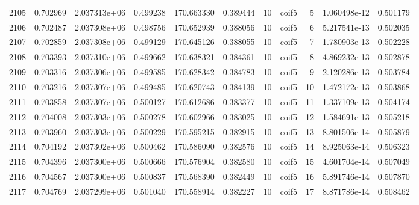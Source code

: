 \begin{tabular}{lrrrrrrlrrr}
2105 &    0.702969 &        2.037313e+06 &  0.499238 &              170.663330 &    0.389444 &      10 &        coif5 &      5 &   1.060498e-12 &      0.501179 \\
2106 &    0.702487 &        2.037308e+06 &  0.498756 &              170.652939 &    0.388056 &      10 &        coif5 &      6 &   5.217541e-13 &      0.502035 \\
2107 &    0.702859 &        2.037308e+06 &  0.499129 &              170.645126 &    0.388055 &      10 &        coif5 &      7 &   1.780903e-13 &      0.502228 \\
2108 &    0.703393 &        2.037310e+06 &  0.499662 &              170.638321 &    0.384361 &      10 &        coif5 &      8 &   4.869232e-13 &      0.502878 \\
2109 &    0.703316 &        2.037306e+06 &  0.499585 &              170.628342 &    0.384783 &      10 &        coif5 &      9 &   2.120286e-13 &      0.503784 \\
2110 &    0.703216 &        2.037307e+06 &  0.499485 &              170.620743 &    0.384139 &      10 &        coif5 &     10 &   1.472172e-13 &      0.503868 \\
2111 &    0.703858 &        2.037307e+06 &  0.500127 &              170.612686 &    0.383377 &      10 &        coif5 &     11 &   1.337109e-13 &      0.504174 \\
2112 &    0.704008 &        2.037303e+06 &  0.500278 &              170.602966 &    0.383025 &      10 &        coif5 &     12 &   1.584691e-13 &      0.505218 \\
2113 &    0.703960 &        2.037303e+06 &  0.500229 &              170.595215 &    0.382915 &      10 &        coif5 &     13 &   8.801506e-14 &      0.505879 \\
2114 &    0.704192 &        2.037302e+06 &  0.500462 &              170.586090 &    0.382576 &      10 &        coif5 &     14 &   8.925063e-14 &      0.506323 \\
2115 &    0.704396 &        2.037300e+06 &  0.500666 &              170.576904 &    0.382580 &      10 &        coif5 &     15 &   4.601704e-14 &      0.507049 \\
2116 &    0.704567 &        2.037300e+06 &  0.500837 &              170.568390 &    0.382449 &      10 &        coif5 &     16 &   5.891746e-14 &      0.507870 \\
2117 &    0.704769 &        2.037299e+06 &  0.501040 &              170.558914 &    0.382227 &      10 &        coif5 &     17 &   8.871786e-14 &      0.508462 \\

\end{tabular}
